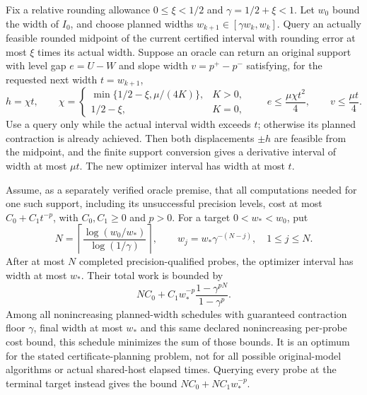 \begin{theorem}
\label{thm:paidwork125}
Fix a relative rounding allowance $0\le\xi<1/2$ and
$\gamma=1/2+\xi<1$. Let $w_0$ bound the width of $I_0$, and choose
planned widths $w_{k+1}\in[\gamma w_k,w_k]$. Query an actually
feasible rounded midpoint of the current certified interval with rounding
error at most $\xi$ times its actual width. Suppose an oracle can return
an original support with level gap $e=U-W$ and slope width $v=p^+-p^-$
satisfying, for the requested next width $t=w_{k+1}$,
\begin{equation}\label{eq:jointprecision125}
 h=\chi t,\qquad
 \chi=\begin{cases}\min\{1/2-\xi,\mu/(4K)\},&K>0,\\
                         1/2-\xi,&K=0,\end{cases}
 \qquad e\le\frac{\mu\chi t^2}{4},\qquad v\le\frac{\mu t}{4}.
\end{equation}
Use a query only while the actual interval width exceeds $t$;
otherwise its planned contraction is already achieved. Then both
displacements $\pm h$ are feasible from the midpoint, and the finite
support conversion gives a derivative interval of width at most $\mu t$.
The new optimizer interval has width at most $t$.

Assume, as a separately verified oracle premise, that all computations
needed for one such support, including its unsuccessful precision levels,
cost at most $C_0+C_1t^{-p}$, with $C_0,C_1\ge0$ and $p>0$.
For a target $0<w_*<w_0$, put
\[
 N=\left\lceil\frac{\log(w_0/w_*)}{\log(1/\gamma)}\right\rceil,
 \qquad w_j=w_*\gamma^{-(N-j)},\quad 1\le j\le N.
\]
After at most $N$ completed precision-qualified probes, the optimizer
interval has width at most $w_*$. Their total work is bounded by
\begin{equation}\label{eq:geometricwork125}
 NC_0+C_1w_*^{-p}\frac{1-\gamma^{pN}}{1-\gamma^p}.
\end{equation}
Among all nonincreasing planned-width schedules with guaranteed
contraction floor $\gamma$, final width at most $w_*$ and this same
declared nonincreasing per-probe cost bound, this schedule minimizes the
sum of those bounds. It is an optimum for the stated certificate-planning
problem, not for all possible original-model algorithms or actual
shared-host elapsed times. Querying every probe at the terminal target
instead gives the bound $NC_0+NC_1w_*^{-p}$.


\end{theorem}
